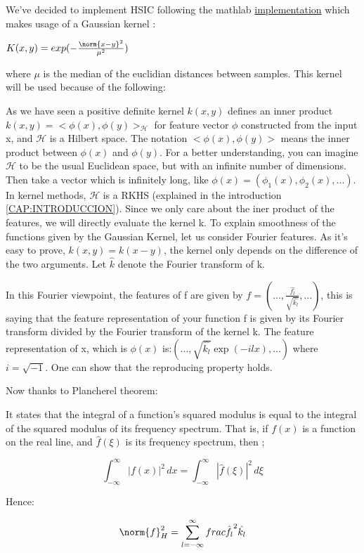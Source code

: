 We've decided to implement HSIC following the mathlab \href{http://www.gatsby.ucl.ac.uk/~gretton/indepTestFiles/indep.htm#GreEtAl10}{implementation} which makes usage of a Gaussian kernel :

$K(x,y) = exp(-\frac{\norm{x-y}^{2}}{\mu^{2}})$

where $\mu$ is the median of the euclidian distances between samples.
This kernel will be used because of the following:

As we have seen a positive definite kernel $k(x,y)$ defines an inner product $k(x,y) = <\phi(x),\phi(y)>_{\mathcal{H}}$ for feature vector $\phi$ constructed from the input x, and $\mathcal{H}$ is a Hilbert space. The notation $<\phi(x),\phi(y)>$ means the inner product between $\phi(x)$ and $\phi(y)$.
For a better understanding, you can imagine $\mathcal{H}$ to be the usual Euclidean space, but with an infinite number of dimensions. Then take a vector which is infinitely long, like $\phi(x) = (\phi_{1}(x),\phi_{2}(x),...)$. In kernel methods, $\mathcal{H}$ is a RKHS (explained in the introduction \ref{CAP:INTRODUCCION}). Since we only care about the iner product of the features, we will directly evaluate the kernel k.
To explain smoothness of the functions given by the Gaussian Kernel, let us consider Fourier features. As it's easy to prove, $k(x,y)=k(x-y)$, the kernel only depends on the difference of the two arguments. Let $\hat{k}$ denote the Fourier transform of k.

In this Fourier viewpoint, the features of f are given by $f = (...,\frac{\hat{f_{l}}}{\sqrt{\hat{k_{l}}}},...)$, this is saying that the feature representation of your function f is given by its Fourier transform divided by the Fourier transform of the kernel k. The feature representation of x, which is $\phi(x)$ is:$(...,\sqrt{\hat{k_{l}}}\exp(-ilx),...)$ where $i = \sqrt{-1}$. One can show that the reproducing property holds.

Now thanks to Plancherel theorem: \cite{plancherel}

It states that the integral of a function's squared modulus is equal to the integral of the squared modulus of its frequency spectrum. That is, if $f(x)$ is a function on the real line, and ${\widehat {f}}(\xi )$ is its frequency spectrum, then ; 

$$
\int _{-\infty }^{\infty }|f(x)|^{2}\,dx=\int _{-\infty }^{\infty }|{\widehat {f}}(\xi )|^{2}\,d\xi
$$

Hence:

$$
\norm{f}^{2}_{H}= \sum_{l=-\infty}^{\infty}frac{\hat{f_{l}}^{2}}{\hat{k_{l}}}
$$

